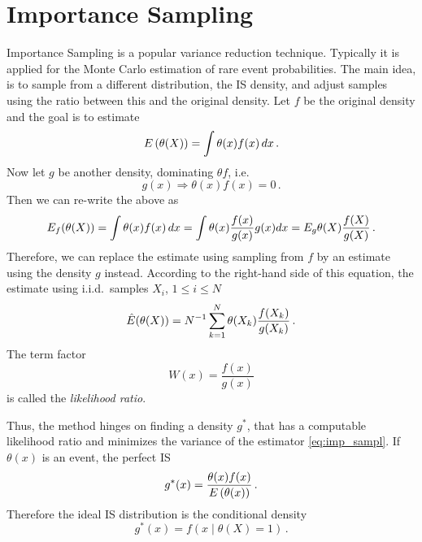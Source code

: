 \section{Importance Sampling}
Importance Sampling is  a popular variance reduction technique.
Typically it is applied for the Monte Carlo estimation of rare event probabilities.
The main idea, is to sample from a different distribution, the \ac{IS} density, and adjust samples using the ratio between this and the original density.
Let $f$ be the original density and the goal is to estimate
\[
    {E}\left(\theta(X)\right) = \int \theta(x)f(x)\,dx\,.
\]
Now let $g$ be another density, dominating $\theta f$, i.e.\ \[g(x)\Rightarrow \theta(x)f(x) = 0\,.\] Then we can re-write the above as
\[
    {E}_f({\theta(X)}) = \int \theta(x)f(x)\,dx = \int \theta(x) \frac{f(x)}{g(x)} g(x) dx = {E}_g \theta(X) \frac{f(X)}{g(X)}\,.
\]
Therefore, we can replace the estimate using sampling from $f$ by an estimate using the density $g$ instead.
According to the right-hand side of this equation, the estimate using i.i.d.\ samples $X_i$, $1\leq i \leq N$
\begin{equation}\label{eq:imp_sampl}
    \hat{{E}}(\theta(X)) = N^{-1} \sum_{k=1}^N \theta(X_k) \frac{f(X_k)}{g(X_k)}\,.
\end{equation}
The term factor
\[
    W(x) = \frac{f(x)}{g(x)}
\]
is called the \emph{likelihood ratio}.

Thus, the method hinges on finding a density $g^{*}$, that has a computable likelihood ratio and  minimizes the variance of the estimator \eqref{eq:imp_sampl}.
If $\theta(x)$ is an event, the perfect \ac{IS} \parencite[Chapter~9.7.1]{kroese2013handbook}
\[
    g^*(x) = \frac{\theta(x) f(x)}{{E}\left(\theta(x)\right)}\,.
\]
Therefore the ideal \ac{IS} distribution is the conditional density
\[
    g^*(x) = f(x \mid \theta(X) = 1)\,.
\]

